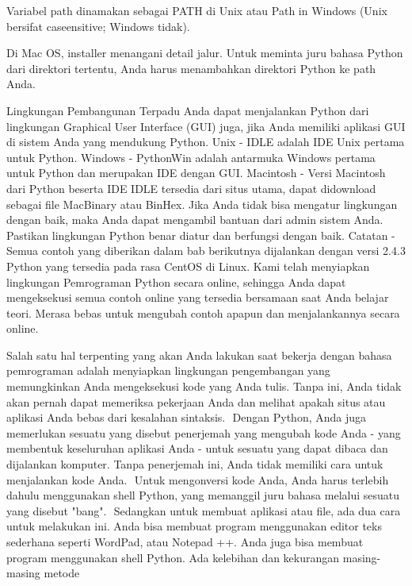 {{{\vspace{14pt}
\noindent
{\fontsize{14pt}{14pt}\selectfont Variabel path dinamakan sebagai PATH di Unix atau Path in Windows (Unix bersifat caseensitive; Windows tidak). \\} \par
\vspace{14pt}
\noindent
{\fontsize{14pt}{14pt}\selectfont Di Mac OS, installer menangani detail jalur. Untuk meminta juru bahasa Python dari direktori tertentu, Anda harus menambahkan direktori Python ke path Anda. \\} \par
\vspace{14pt}
\noindent
{\fontsize{14pt}{14pt}\selectfont \vspace{\baselineskip}
Lingkungan Pembangunan Terpadu Anda dapat menjalankan Python dari lingkungan Graphical User Interface (GUI) juga, jika Anda memiliki aplikasi GUI di sistem Anda yang mendukung Python. Unix - IDLE adalah IDE Unix pertama untuk Python. Windows - PythonWin adalah antarmuka Windows pertama untuk Python dan merupakan IDE dengan GUI. Macintosh - Versi Macintosh dari Python beserta IDE IDLE tersedia dari situs utama, dapat didownload sebagai file MacBinary atau BinHex. Jika Anda tidak bisa mengatur lingkungan dengan baik, maka Anda dapat mengambil bantuan dari admin sistem Anda. Pastikan lingkungan Python benar diatur dan berfungsi dengan baik. Catatan - Semua contoh yang diberikan dalam bab berikutnya dijalankan dengan versi 2.4.3 Python yang tersedia pada rasa CentOS di Linux. Kami telah menyiapkan lingkungan Pemrograman Python secara online, sehingga Anda dapat mengeksekusi semua contoh online yang tersedia bersamaan saat Anda belajar teori. Merasa bebas untuk mengubah contoh apapun dan menjalankannya secara online. \\} \par
\vspace{14pt}
\noindent
{\fontsize{14pt}{14pt}\selectfont \vspace{\baselineskip}
Salah satu hal terpenting yang akan Anda lakukan saat bekerja dengan bahasa pemrograman adalah menyiapkan lingkungan pengembangan yang memungkinkan Anda mengeksekusi kode yang Anda tulis. Tanpa ini, Anda tidak akan pernah dapat memeriksa pekerjaan Anda dan melihat apakah situs atau aplikasi Anda bebas dari kesalahan sintaksis.  $  $ Dengan Python, Anda juga memerlukan sesuatu yang disebut penerjemah yang mengubah kode Anda - yang membentuk keseluruhan aplikasi Anda - untuk sesuatu yang dapat dibaca dan dijalankan komputer. Tanpa penerjemah ini, Anda tidak memiliki cara untuk menjalankan kode Anda.  $  $ Untuk mengonversi kode Anda, Anda harus terlebih dahulu menggunakan shell Python, yang memanggil juru bahasa melalui sesuatu yang disebut "bang".  $  $ Sedangkan untuk membuat aplikasi atau file, ada dua cara untuk melakukan ini. Anda bisa membuat program menggunakan editor teks sederhana seperti WordPad, atau Notepad ++. Anda juga bisa membuat program menggunakan shell Python. Ada kelebihan dan kekurangan masing-masing metode \\} \par
}}}
